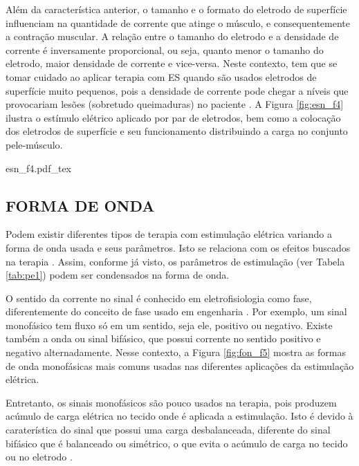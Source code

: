 Além da característica anterior, o tamanho e o formato do eletrodo de superfície influenciam na quantidade de corrente que atinge o músculo, e consequentemente a contração muscular. A relação entre o tamanho do eletrodo e a densidade de corrente é inversamente proporcional, ou seja, quanto menor o tamanho do eletrodo, maior densidade de corrente e vice-versa. Neste contexto, tem que se tomar cuidado ao aplicar terapia com ES quando são usados eletrodos de superfície muito pequenos, pois a densidade de corrente pode chegar a níveis que provocariam lesões (sobretudo queimaduras) no paciente \cite{Faria2006ImplementacaoMedulares, Delitto1988ElectricalSurgery}. A Figura \ref{fig:esn_f4} ilustra o estímulo elétrico aplicado por par de eletrodos, bem como a colocação dos eletrodos de superfície e seu funcionamento distribuindo a carga no conjunto pele-músculo.

\begin{figure*}[h]
    \centering %
    \small %
    \def\svgwidth{0.9\columnwidth}%
    {esn_f4.pdf_tex}
    \caption{Estimulação elétrica do nervo por meio de eletrodos de superfície (adaptado de  \cite{Robinson2002EletrofisiologiaEletrofisiologico}).}
    \label{fig:esn_f4}
\end{figure*}

\subsection{FORMA DE ONDA}
Podem existir diferentes tipos de terapia com estimulação elétrica variando a forma de onda usada e seus parâmetros. Isto se relaciona com os efeitos buscados na terapia \cite{Paulo2007EfeitosEsqueletico}. Assim, conforme já visto, os parâmetros de estimulação (ver Tabela \ref{tab:pe1}) podem ser condensados na forma de onda.

O sentido da corrente no sinal é conhecido em eletrofisiologia como fase, diferentemente do conceito de fase usado em engenharia \cite{Robinson2002EletrofisiologiaEletrofisiologico}. Por exemplo, um sinal monofásico tem fluxo só em um sentido, seja ele, positivo ou negativo. Existe também a onda ou sinal bifásico, que possui corrente no sentido positivo e negativo alternadamente. Nesse contexto, a Figura \ref{fig:fon_f5} mostra as formas de onda monofásicas mais comuns usadas nas diferentes aplicações da estimulação elétrica. 

Entretanto, os sinais monofásicos são pouco usados na terapia, pois produzem acúmulo de carga elétrica no tecido onde é aplicada a estimulação. Isto é devido à caraterística do sinal que possui uma carga desbalanceada, diferente do sinal bifásico que é balanceado ou simétrico, o que evita o acúmulo de carga no tecido ou no eletrodo \cite{Wu2002AApplications}.

